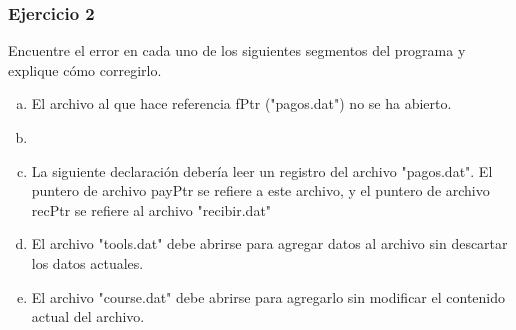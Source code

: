 \subsubsection*{Ejercicio 2} 
Encuentre el error en cada uno de los siguientes segmentos del programa y explique cómo corregirlo.
\begin{enumerate}[a)]
  \item El archivo al que hace referencia fPtr ("pagos.dat") no se ha abierto.
    \lstset{inputencoding=utf8/latin1}
    
  \item \ \ \ 
    
  \item La siguiente declaración debería leer un registro del archivo "pagos.dat". 
    El puntero de archivo payPtr se refiere a este archivo, y el puntero de archivo recPtr se refiere al archivo "recibir.dat"
    
  \item El archivo "tools.dat" debe abrirse para agregar datos al archivo sin descartar los datos actuales.
    
  \item El archivo "course.dat" debe abrirse para agregarlo sin modificar el contenido actual del archivo.
    
\end{enumerate}



